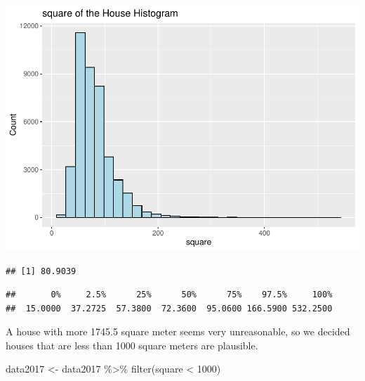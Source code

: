 \documentclass[
]{article}
\newenvironment{Shaded}{\begin{snugshade}}{\end{snugshade}}
\newcommand{\DecValTok}[1]{\textcolor[rgb]{0.00,0.00,0.81}{#1}}
\newcommand{\FloatTok}[1]{\textcolor[rgb]{0.00,0.00,0.81}{#1}}
\newcommand{\FunctionTok}[1]{\textcolor[rgb]{0.00,0.00,0.00}{#1}}
\newcommand{\NormalTok}[1]{#1}
\newcommand{\OtherTok}[1]{\textcolor[rgb]{0.56,0.35,0.01}{#1}}
\newcommand{\SpecialCharTok}[1]{\textcolor[rgb]{0.00,0.00,0.00}{#1}}
\begin{document}
\includegraphics{Project_files/figure-latex/unnamed-chunk-17-1.pdf}

\begin{Shaded}
\end{Shaded}

\begin{verbatim}
## [1] 80.9039
\end{verbatim}

\begin{Shaded}
\end{Shaded}

\begin{verbatim}
##       0%     2.5%      25%      50%      75%    97.5%     100% 
##  15.0000  37.2725  57.3800  72.3600  95.0600 166.5900 532.2500
\end{verbatim}

A house with more 1745.5 square meter seems very unreasonable, so we
decided houses that are less than 1000 square meters are plausible.

\begin{Shaded}
\begin{Highlighting}[]
\NormalTok{data2017 }\OtherTok{\textless{}{-}}\NormalTok{ data2017 }\SpecialCharTok{\%\textgreater{}\%} 
  \FunctionTok{filter}\NormalTok{(square }\SpecialCharTok{\textless{}} \DecValTok{1000}\NormalTok{)}
\end{Highlighting}
\end{Shaded}
\end{document}
